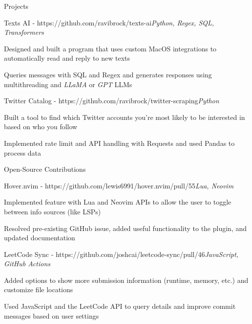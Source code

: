 \documentclass{resume}
\begin{document}
    \begin{rSection}{Projects}
        \begin{rSubsection}{Texts AI - \textnormal{https://github.com/ravibrock/texts-ai}}{\textit{Python, Regex, SQL, Transformers}}{}{}
            \item Designed and built a program that uses custom MacOS integrations to automatically read and reply to new texts
            \item Queries messages with SQL and Regex and generates responses using multithreading and \textit{LLaMA} or \textit{GPT} LLMs
        \end{rSubsection}
        \begin{rSubsection}{Twitter Catalog - \textnormal{https://github.com/ravibrock/twitter-scraping}}{\textit{Python}}{}{}
            \item Built a tool to find which Twitter accounts you're most likely to be interested in based on who you follow
            \item Implemented rate limit and API handling with Requests and used Pandas to process data
        \end{rSubsection}
    \end{rSection}
    \begin{rSection}{Open-Source Contributions}
        \begin{rSubsection}{Hover.nvim - \textnormal{https://github.com/lewis6991/hover.nvim/pull/55}}{\textit{Lua, Neovim}}{}{}
            \item Implemented feature with Lua and Neovim APIs to allow the user to toggle between info sources (like LSPs)
            \item Resolved pre-existing GitHub issue, added useful functionality to the plugin, and updated documentation
        \end{rSubsection}
        \begin{rSubsection}{LeetCode Sync - \textnormal{https://github.com/joshcai/leetcode-sync/pull/46}}{\textit{JavaScript, GitHub Actions}}{}{}
            \item Added options to show more submission information (runtime, memory, etc.) and customize file locations
            \item Used JavaScript and the LeetCode API to query details and improve commit messages based on user settings
        \end{rSubsection}
    \end{rSection}
\end{document}
